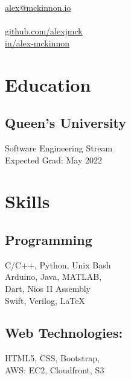 \documentclass[]{hieudo-build}
\begin{document}
%
%
{
	\faEnvelope \href{mailto:alex@mckinnon.io}{ alex@mckinnon.io}\\
	 \\
	\faGithub \href{https://github.com/alexjmck}{   github.com/alexjmck}\\
	\faLinkedinSquare \href{https://www.linkedin.com/in/alex-mckinnon}{   in/alex-mckinnon}
}
    
%
%
\begin{minipage}[t]{0.3\textwidth} 

\section{Education} 

\subsection{Queen's University}
Software Engineering Stream \\
Expected Grad: May 2022 \\
\sectionsep

\section{Skills}
\subsection{Programming}
C/C++, Python, Unix Bash\\ 
Arduino, Java, MATLAB, \\ 
Dart, Nios II Assembly\\ 
Swift, Verilog, \LaTeX

\subsection{Web Technologies:}
HTML5, CSS, Bootstrap, \\
AWS: EC2, Cloudfront, S3 \\


\end{minipage}
\end{document}
